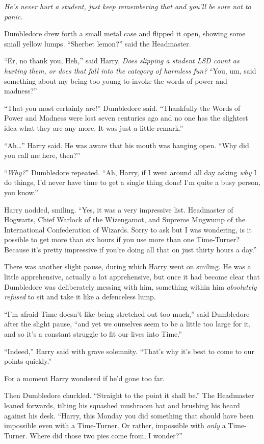 \emph{He’s never hurt a student, just keep remembering that and you’ll be sure not to panic.}

Dumbledore drew forth a small metal case and flipped it open, showing some small yellow lumps. “Sherbet lemon?” said the Headmaster.

“Er, no thank you, Heh,” said Harry. \emph{Does slipping a student LSD count as hurting them, or does that fall into the category of harmless fun?} “You, um, said something about my being too young to invoke the words of power and madness?”

“That you most certainly are!” Dumbledore said. “Thankfully the Words of Power and Madness were lost seven centuries ago and no one has the slightest idea what they are any more. It was just a little remark.”

“Ah…” Harry said. He was aware that his mouth was hanging open. “Why did you call me here, then?”

“\emph{Why?}” Dumbledore repeated. “Ah, Harry, if I went around all day asking \emph{why} I do things, I’d never have time to get a single thing done! I’m quite a busy person, you know.”

Harry nodded, smiling. “Yes, it was a very impressive list. Headmaster of Hogwarts, Chief Warlock of the Wizengamot, and Supreme Mugwump of the International Confederation of Wizards. Sorry to ask but I was wondering, is it possible to get more than six hours if you use more than one Time-Turner? Because it’s pretty impressive if you’re doing all that on just thirty hours a day.”

There was another slight pause, during which Harry went on smiling. He was a little apprehensive, actually a lot apprehensive, but once it had become clear that Dumbledore was deliberately messing with him, something within him \emph{absolutely refused} to sit and take it like a defenceless lump.

“I’m afraid Time doesn’t like being stretched out too much,” said Dumbledore after the slight pause, “and yet we ourselves seem to be a little too large for it, and so it’s a constant struggle to fit our lives into Time.”

“Indeed,” Harry said with grave solemnity. “That’s why it’s best to come to our points quickly.”

For a moment Harry wondered if he’d gone too far.

Then Dumbledore chuckled. “Straight to the point it shall be.” The Headmaster leaned forwards, tilting his squashed mushroom hat and brushing his beard against his desk. “Harry, this Monday you did something that should have been impossible even with a Time-Turner. Or rather, impossible with \emph{only} a Time-Turner. Where did those two pies come from, I wonder?”

